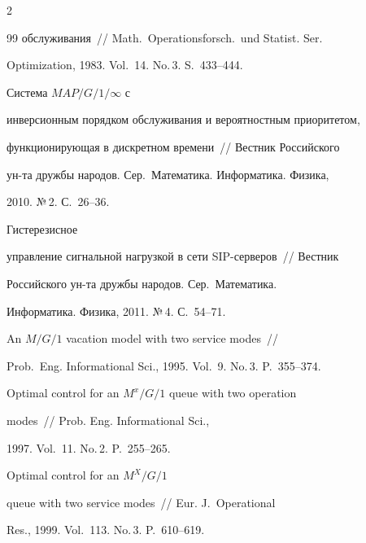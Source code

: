 \begin{multicols}{2}
{{\begin{thebibliography}{99}
обслуживания~// Math.\ Operationsforsch.\ und Statist. Ser.\


Optimization, 1983. Vol.~14. No.\,3. S.~433--444.







 Система $MAP/G/1/\infty$ с


инверсионным порядком обслуживания и вероятностным приоритетом,


функционирующая в дискретном времени~// Вестник Российского


ун-та дружбы народов. Сер.\ Математика. Информатика. Физика,


2010. №\,2. С.~26--36.







 Гистерезисное


управление сигнальной нагрузкой в сети SIP-сер\-ве\-ров~// Вестник


Российского ун-та дружбы народов. Сер.\ Математика.


Информатика. Физика, 2011. №\,4. С.~54--71.









An $M/G/1$ vacation model with two service modes~//


Prob.\ Eng. Informational Sci., 1995. Vol.~9. No.\,3. P.~355--374.









Optimal control for an $M^x/G/1$ queue with two operation


modes~// Prob. Eng.  Informational Sci.,


1997. Vol.~11. No.\,2. P.~255--265.







 Optimal control for an $M^X/G/1$


queue with two service mo\-des~// Eur. J.~Operational


Res., 1999. Vol.~113. No.\,3. P.~610--619.






\end{thebibliography}}}
\end{multicols}
